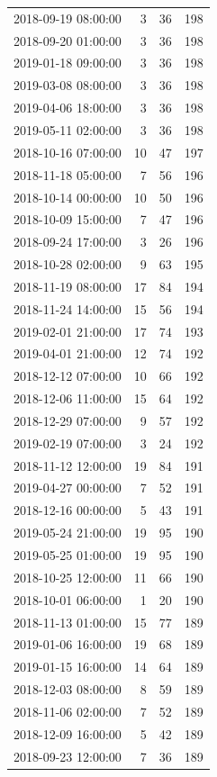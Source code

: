 \begin{tabular}{lrrr}
2018-09-19 08:00:00 & 3 & 36 & 198 \\
2018-09-20 01:00:00 & 3 & 36 & 198 \\
2019-01-18 09:00:00 & 3 & 36 & 198 \\
2019-03-08 08:00:00 & 3 & 36 & 198 \\
2019-04-06 18:00:00 & 3 & 36 & 198 \\
2019-05-11 02:00:00 & 3 & 36 & 198 \\
2018-10-16 07:00:00 & 10 & 47 & 197 \\
2018-11-18 05:00:00 & 7 & 56 & 196 \\
2018-10-14 00:00:00 & 10 & 50 & 196 \\
2018-10-09 15:00:00 & 7 & 47 & 196 \\
2018-09-24 17:00:00 & 3 & 26 & 196 \\
2018-10-28 02:00:00 & 9 & 63 & 195 \\
2018-11-19 08:00:00 & 17 & 84 & 194 \\
2018-11-24 14:00:00 & 15 & 56 & 194 \\
2019-02-01 21:00:00 & 17 & 74 & 193 \\
2019-04-01 21:00:00 & 12 & 74 & 192 \\
2018-12-12 07:00:00 & 10 & 66 & 192 \\
2018-12-06 11:00:00 & 15 & 64 & 192 \\
2018-12-29 07:00:00 & 9 & 57 & 192 \\
2019-02-19 07:00:00 & 3 & 24 & 192 \\
2018-11-12 12:00:00 & 19 & 84 & 191 \\
2019-04-27 00:00:00 & 7 & 52 & 191 \\
2018-12-16 00:00:00 & 5 & 43 & 191 \\
2019-05-24 21:00:00 & 19 & 95 & 190 \\
2019-05-25 01:00:00 & 19 & 95 & 190 \\
2018-10-25 12:00:00 & 11 & 66 & 190 \\
2018-10-01 06:00:00 & 1 & 20 & 190 \\
2018-11-13 01:00:00 & 15 & 77 & 189 \\
2019-01-06 16:00:00 & 19 & 68 & 189 \\
2019-01-15 16:00:00 & 14 & 64 & 189 \\
2018-12-03 08:00:00 & 8 & 59 & 189 \\
2018-11-06 02:00:00 & 7 & 52 & 189 \\
2018-12-09 16:00:00 & 5 & 42 & 189 \\
2018-09-23 12:00:00 & 7 & 36 & 189 \\

\end{tabular}
